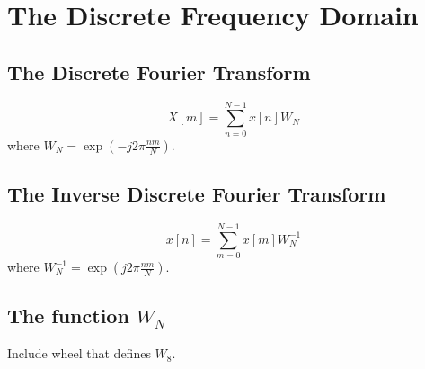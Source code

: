 
\section*{The Discrete Frequency Domain}

\subsection*{The Discrete Fourier Transform}

$$
X[m] = \sum_{n=0}^{N-1} x[n] W_N
$$
where $W_N = \exp(-j2\pi\frac{nm}{N})$.

\subsection*{The Inverse Discrete Fourier Transform}

$$
x[n] = \sum_{m=0}^{N-1}  x[m]W_N^{-1}
$$
where $W_N^{-1}=\exp(j2\pi\frac{nm}{N})$.

\subsection*{The function $W_N$}

Include wheel that defines $W_8$.

\endinput